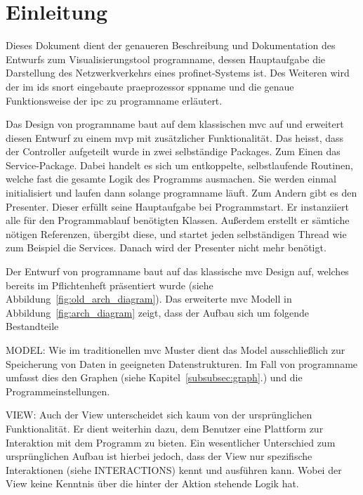 \chapter{Einleitung}
Dieses Dokument dient der genaueren Beschreibung und Dokumentation des Entwurfs zum Visualisierungstool \gls{programname}, dessen Hauptaufgabe die Darstellung des Netzwerkverkehrs eines \gls{profinet}-Systems ist. Des Weiteren wird der im \gls{ids} \gls{snort} eingebaute \gls{praeprozessor} \gls{sppname} und die genaue Funktionsweise der \gls{ipc} zu \gls{programname} erläutert.\newline
\newline


Das Design von \gls{programname} baut auf dem klassischen \gls{mvc} auf und erweitert diesen Entwurf zu einem \gls{mvp} mit zusätzlicher Funktionalität. Das heisst, dass der Controller aufgeteilt wurde in zwei selbständige Packages. Zum Einen das Service-Package. Dabei handelt es sich um entkoppelte, selbstlaufende Routinen, welche fast die gesamte Logik des Programms ausmachen. Sie werden einmal initialisiert und laufen dann solange \gls{programname} läuft. Zum Andern gibt es den Presenter. Dieser erfüllt seine Hauptaufgabe bei Programmstart. Er instanziiert alle für den Programmablauf benötigten Klassen. Außerdem erstellt er sämtiche nötigen Referenzen, übergibt diese, und startet jeden selbständigen Thread wie zum Beispiel die Services. Danach wird der Presenter nicht mehr benötigt.

Der Entwurf von \gls{programname} baut auf das klassische \gls{mvc} Design auf, welches bereits im Pflichtenheft präsentiert wurde (siehe Abbildung~\ref{fig:old_arch_diagram}). Das erweiterte \gls{mvc} Modell in Abbildung~\ref{fig:arch_diagram} zeigt, dass der Aufbau sich um folgende Bestandteile

MODEL:
Wie im traditionellen \gls{mvc} Muster dient das Model ausschließlich zur Speicherung von Daten in geeigneten Datenstrukturen. Im Fall von \gls{programname} umfasst dies den Graphen (siehe Kapitel~\ref{subsubsec:graph}.) und die Programmeinstellungen.

VIEW:
Auch der View unterscheidet sich kaum von der ursprünglichen Funktionalität. Er dient weiterhin dazu, dem Benutzer eine Plattform zur Interaktion mit dem Programm zu bieten. Ein wesentlicher Unterschied zum ursprünglichen Aufbau ist hierbei jedoch, dass der View nur spezifische Interaktionen (siehe INTERACTIONS) kennt und ausführen kann. Wobei der View keine Kenntnis über die hinter der Aktion stehende Logik hat.

